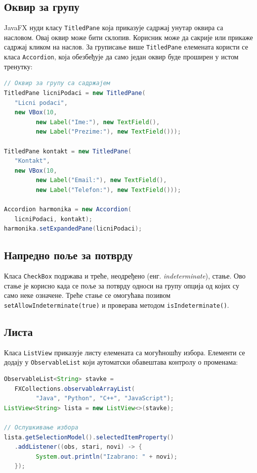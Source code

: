 \subsection{Оквир за групу}

JavaFX нуди класу \texttt{TitledPane} која приказује садржај унутар оквира са насловом. Овај оквир може бити склопив. Корисник може да сакрије или прикаже садржај кликом на наслов. За груписање више \texttt{TitledPane} елемената користи се класа \texttt{Accordion}, која обезбеђује да само један оквир буде проширен у истом тренутку:


\begin{lstlisting}[language=Java]
// Оквир за групу са садржајем
TitledPane licniPodaci = new TitledPane(
   "Licni podaci",
   new VBox(10,
         new Label("Ime:"), new TextField(),
         new Label("Prezime:"), new TextField()));
 
TitledPane kontakt = new TitledPane(
   "Kontakt",
   new VBox(10,
         new Label("Email:"), new TextField(),
         new Label("Telefon:"), new TextField()));
 
Accordion harmonika = new Accordion(
   licniPodaci, kontakt);
harmonika.setExpandedPane(licniPodaci);
\end{lstlisting}


\subsection{Напредно поље за потврду}

Класа \texttt{CheckBox} подржава и треће, неодређено (енг. \textit{indeterminate}), стање. Ово стање је корисно када се поље за потврду односи на групу опција од којих су само неке означене. Треће стање се омогућава позивом \texttt{setAllowIndeterminate(true)} и проверава методом \texttt{isIndeterminate()}.


\subsection{Листа}

Класа \texttt{ListView} приказује листу елемената са могућношћу избора. Елементи се додају у \texttt{ObservableList} који аутоматски обавештава контролу о променама:


\begin{lstlisting}[language=Java]
ObservableList<String> stavke =
   FXCollections.observableArrayList(
         "Java", "Python", "C++", "JavaScript");
ListView<String> lista = new ListView<>(stavke);
 
// Ослушкивање избора
lista.getSelectionModel().selectedItemProperty()
   .addListener((obs, stari, novi) -> {
         System.out.println("Izabrano: " + novi);
   });
\end{lstlisting}


